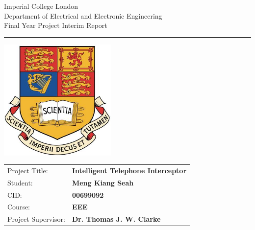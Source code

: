 \documentclass[12pt,a4paper]{report}
\begin{document}
\begin{titlepage}
                \setlength{\parindent}{0pt}
                \setlength{\parskip}{0pt}

                {
                                \Large
                                \raggedright
                                Imperial College London\\[17pt]
                                Department of Electrical and Electronic Engineering\\[17pt]
                                Final Year Project Interim Report\\[17pt]

                }

                \rule{\columnwidth}{3pt}
                \vfill
                \centering
                  \includegraphics[width=0.7\columnwidth,height=60mm,keepaspectratio]{icl.jpg}
                \vfill
                \setlength{\tabcolsep}{0pt}

                \begin{tabular}{p{40mm}p{\dimexpr\columnwidth-40mm}}
                                Project Title: & \textbf{Intelligent Telephone Interceptor} \\[12pt]
                                Student: & \textbf{Meng Kiang Seah} \\[12pt]
                                CID: & \textbf{00699092} \\[12pt]
                                Course: & \textbf{EEE} \\[12pt]
                                Project Supervisor: & \textbf{Dr. Thomas J. W. Clarke} \\[12pt]
                \end{tabular}
\end{titlepage}
\end{document}
